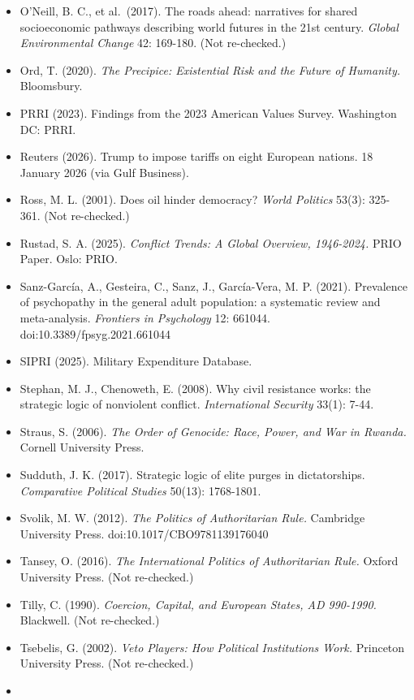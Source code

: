 \documentclass[
  10pt,
]{article}
\begin{document}
\begin{itemize}
\item
  O'Neill, B. C., et al.~(2017). The roads ahead: narratives for shared socioeconomic pathways
  describing world futures in the 21st century. \emph{Global Environmental Change} 42: 169-180. (Not
  re-checked.)
\item
  Ord, T. (2020). \emph{The Precipice: Existential Risk and the Future of Humanity.} Bloomsbury.
\item
  PRRI (2023). Findings from the 2023 American Values Survey. Washington DC: PRRI.
\item
  Reuters (2026). Trump to impose tariffs on eight European nations. 18 January 2026 (via Gulf
  Business).
\item
  Ross, M. L. (2001). Does oil hinder democracy? \emph{World Politics} 53(3): 325-361. (Not
  re-checked.)
\item
  Rustad, S. A. (2025). \emph{Conflict Trends: A Global Overview, 1946-2024.} PRIO Paper. Oslo:
  PRIO.
\item
  Sanz-García, A., Gesteira, C., Sanz, J., García-Vera, M. P. (2021). Prevalence of psychopathy in
  the general adult population: a systematic review and meta-analysis. \emph{Frontiers in
  Psychology} 12: 661044. doi:10.3389/fpsyg.2021.661044
\item
  SIPRI (2025). Military Expenditure Database.
\item
  Stephan, M. J., Chenoweth, E. (2008). Why civil resistance works: the strategic logic of
  nonviolent conflict. \emph{International Security} 33(1): 7-44.
\item
  Straus, S. (2006). \emph{The Order of Genocide: Race, Power, and War in Rwanda.} Cornell
  University Press.
\item
  Sudduth, J. K. (2017). Strategic logic of elite purges in dictatorships. \emph{Comparative
  Political Studies} 50(13): 1768-1801.
\item
  Svolik, M. W. (2012). \emph{The Politics of Authoritarian Rule.} Cambridge University Press.
  doi:10.1017/CBO9781139176040
\item
  Tansey, O. (2016). \emph{The International Politics of Authoritarian Rule.} Oxford University
  Press. (Not re-checked.)
\item
  Tilly, C. (1990). \emph{Coercion, Capital, and European States, AD 990-1990.} Blackwell. (Not
  re-checked.)
\item
  Tsebelis, G. (2002). \emph{Veto Players: How Political Institutions Work.} Princeton University
  Press. (Not re-checked.)
\item

\end{itemize}
\end{document}

